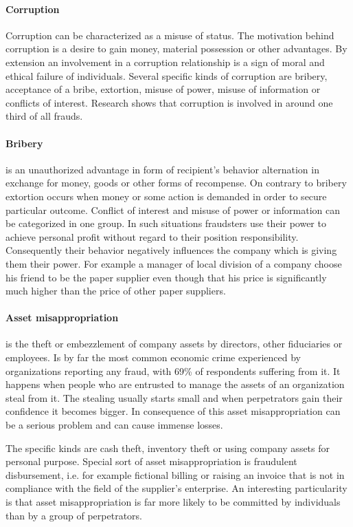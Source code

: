\paragraph {Corruption}
Corruption can be characterized as a misuse of status. The motivation behind corruption is a desire to gain money, material possession or other advantages. By extension an involvement in a corruption relationship is a sign of moral and ethical failure of individuals. Several specific kinds of corruption are bribery, acceptance of a bribe, extortion, misuse of power, misuse of information or conflicts of interest. Research shows that corruption is involved in around one third of all frauds. \cite{weaver}

\paragraph{Bribery} is an unauthorized advantage in form of recipient's behavior alternation in exchange for money, goods or other forms of recompense. On contrary to bribery extortion occurs when money or some action is demanded in order to secure particular outcome. Conflict of interest and misuse of power or information can be categorized in one group. In such situations fraudsters use their power to achieve personal profit without regard to their position responsibility. Consequently their behavior negatively influences the company which is giving them their power. For example a manager of local division of a company choose his friend to be the paper supplier even though that his price is significantly much higher than the price of other paper suppliers.


\paragraph {Asset misappropriation}
is the theft or embezzlement of company assets by directors, other fiduciaries or employees. Is by far the most common economic crime experienced by organizations reporting any fraud, with 69\% of respondents suffering from it. \cite{pwc-asset} It happens when people who are entrusted to manage the assets of an organization steal from it. The stealing usually starts small and when perpetrators gain their confidence it becomes bigger. In consequence of this asset misappropriation can be a serious problem and can cause immense losses. 

The specific kinds are cash theft, inventory theft or using company assets for personal purpose. Special sort of asset misappropriation is fraudulent disbursement, i.e. for example fictional billing or raising an invoice that is not in compliance with the field of the supplier's enterprise. An interesting particularity is that asset misappropriation is far more likely to be committed by individuals than by a group of perpetrators\cite{whitepaper}.


